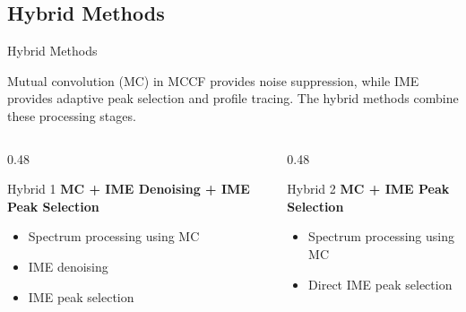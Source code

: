 \documentclass[10.5pt]{beamer}
\begin{document}
\subsection{Hybrid Methods}
\begin{frame}{Hybrid Methods}
\small


Mutual convolution (MC) in MCCF provides noise suppression,
while IME provides adaptive peak selection and profile tracing.
The hybrid methods combine these processing stages.


\vspace{0.35 cm}

\begin{columns}[T,onlytextwidth]

    \begin{column}{0.48\textwidth}
        \begin{block}{Hybrid 1}
            \centering
            \textbf{MC + IME Denoising + IME Peak Selection}

            \vspace{0.2cm}

            \begin{itemize}
                \item Spectrum processing using MC
                \item IME denoising
                \item IME peak selection
            \end{itemize}
        \end{block}
    \end{column}

    \begin{column}{0.48\textwidth}
        \begin{block}{Hybrid 2}
            \centering
            \textbf{MC + IME Peak Selection}

            \vspace{0.2cm}

            \begin{itemize}
                \item Spectrum processing using MC
                \item Direct IME peak selection
            \end{itemize}
        \end{block}
    \end{column}

\end{columns}

\vspace{0.2cm}
\end{frame}
\end{document}
